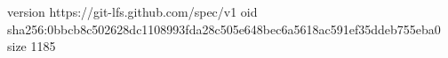 version https://git-lfs.github.com/spec/v1
oid sha256:0bbcb8c502628dc1108993fda28c505e648bec6a5618ac591ef35ddeb755eba0
size 1185
